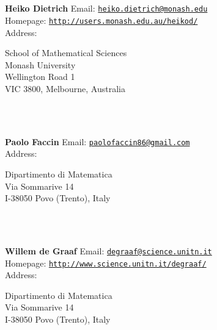 \documentclass[a4paper,11pt]{report}
\begin{document}
\begin{titlepage}
\mbox{}\\
{\mbox{}\\
\small \noindent \textbf{ Heiko Dietrich   }  Email: \href{mailto://heiko.dietrich@monash.edu} {\texttt{heiko.dietrich@monash.edu}}\\
  Homepage: \href{http://users.monash.edu.au/~heikod/} {\texttt{http://users.monash.edu.au/\texttt{}heikod/}}\\
  Address: \begin{minipage}[t]{8cm}\noindent
 School of Mathematical Sciences\\
 Monash University\\
 Wellington Road 1\\
 VIC 3800, Melbourne, Australia\\
 \end{minipage}
}\\
{\mbox{}\\
\small \noindent \textbf{ Paolo Faccin   }  Email: \href{mailto://paolofaccin86@gmail.com} {\texttt{paolofaccin86@gmail.com}}\\
  Address: \begin{minipage}[t]{8cm}\noindent
 Dipartimento di Matematica\\
 Via Sommarive 14\\
 I-38050 Povo (Trento), Italy\\
 \end{minipage}
}\\
{\mbox{}\\
\small \noindent \textbf{ Willem de Graaf    }  Email: \href{mailto://degraaf@science.unitn.it} {\texttt{degraaf@science.unitn.it}}\\
  Homepage: \href{http://www.science.unitn.it/~degraaf/} {\texttt{http://www.science.unitn.it/\texttt{}degraaf/}}\\
  Address: \begin{minipage}[t]{8cm}\noindent
 Dipartimento di Matematica\\
 Via Sommarive 14\\
 I-38050 Povo (Trento), Italy\\
 \end{minipage}
}\\
\end{titlepage}
\end{document}

